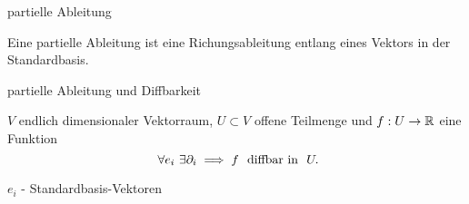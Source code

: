 \documentclass[class=article, crop=false]{standalone}
\begin{document}
\begin{zettel}{partielle Ableitung}
\begin{flashcard}
    \begin{definition}
Eine partielle Ableitung ist eine Richungsableitung entlang eines Vektors in der Standardbasis.
\end{definition}
\end{flashcard}


\begin{flashcard}
\begin{question}
partielle Ableitung und Diffbarkeit
\end{question}
\begin{theorem}
    $V$ endlich dimensionaler Vektorraum, $U \subset  V$ offene Teilmenge und $f: U \to  \mathbb{R} $ eine Funktion
\[
    \forall e_i \exists \partial _i \implies f \tx{ diffbar in } U
.\]

$e_i$ - Standardbasis-Vektoren
\end{theorem}
\end{flashcard}

\end{zettel}
\end{document}
